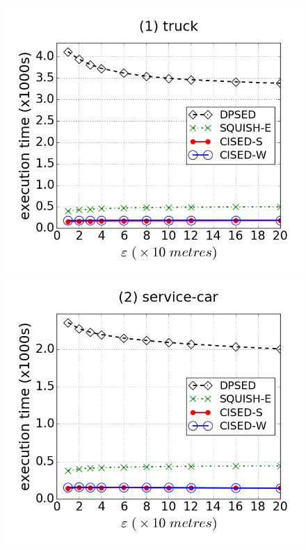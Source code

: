 \begin{figure}[tb!]
\centering
\includegraphics[scale = 0.240]{figures/Exp-time-epsilon-truck.png}
\includegraphics[scale = 0.240]{figures/Exp-time-epsilon-service.png}

\end{figure}
